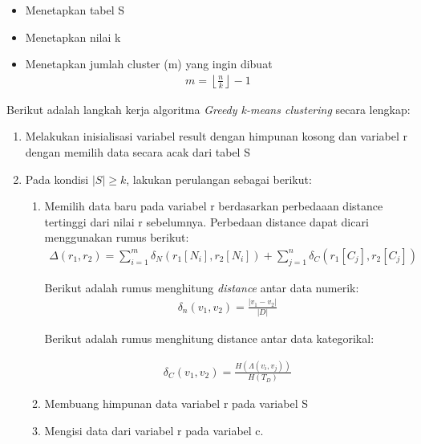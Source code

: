 \begin{itemize}
\item Menetapkan tabel S  
\item Menetapkan nilai k
\item Menetapkan jumlah cluster (m) yang ingin dibuat
\begin{align}
m = \left \lfloor \frac{n}{k} \right \rfloor - 1
\end{align}
\end{itemize}

\vspace{0.5cm}
\noindent Berikut adalah langkah kerja algoritma \textit{Greedy k-means clustering} secara lengkap:

\begin{enumerate}
\item Melakukan inisialisasi variabel result dengan himpunan kosong dan variabel r dengan memilih data secara acak dari tabel S

\item Pada kondisi $|S| \geq k$, lakukan perulangan sebagai berikut:

\begin{enumerate}
\item Memilih data baru pada variabel r berdasarkan perbedaaan distance tertinggi dari nilai r sebelumnya. Perbedaan distance dapat dicari menggunakan rumus berikut:
\begin{align*}
\Delta (r_1,r_2) = \sum_{i=1}^{m} \delta_N(r_1[N_i],r_2	[N_i]) +  \sum_{j=1}^{n} \delta_C(r_1[C_j],r_2[C_j])
\end{align*}

\noindent Berikut adalah rumus menghitung \textit{distance} antar data numerik:
\begin{align*}
\delta_n(v_1,v_2) = \frac{|v_1 - v_2|}{|D|} 
\end{align*}

\vspace{0.4cm}

\noindent Berikut adalah rumus menghitung distance antar data kategorikal:

\begin{align*}
\delta_C(v_1,v_2) = \frac{H(\Lambda(v_i,v_j))}{H(T_D)} 
\end{align*}

\vspace{0.4cm}

\item Membuang himpunan data variabel r pada variabel S

\item Mengisi data dari variabel r pada variabel c.


\end{enumerate}
\end{enumerate}
